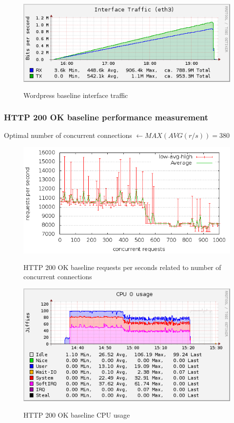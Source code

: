 \documentclass[Measurements]{subfiles}
\begin{document}
\begin{figure}[H]
\centering
\caption{Wordpress baseline interface traffic}
\includegraphics[scale=0.7]{images/results/baseline_wp/interface.png}
\label{fig:Baseline Nginx interface traffic}
\end{figure}

\subsubsection{HTTP 200 OK baseline performance measurement}

Optimal number of concurrent connections $ \leftarrow MAX(AVG(r/s)) = 380$

\begin{figure}[H]
\caption{HTTP 200 OK baseline requests per seconds related to number of concurrent connections}
\centering
\includegraphics[scale=0.55] {images/results/baseline_200/output.png}
\label{fig:Baseline performance measurement}
\end{figure}

\begin{figure}[H]
\centering
\caption{HTTP 200 OK baseline CPU usage}
\includegraphics[scale=0.7]{images/results/baseline_200/cpu.png}
\label{fig:Baseline Nginx CPU usage}
\end{figure}
\end{document}
